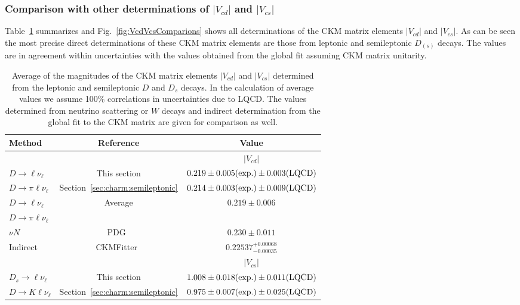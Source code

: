 \subsubsection{Comparison with other determinations of $|V_{cd}|$ and $|V_{cs}|$}

Table~\ref{tab:CKMVcdVcs} summarizes and Fig.~\ref{fig:VcdVcsComparions} shows all determinations of the CKM matrix elements $|V_{cd}|$ and $|V_{cs}|$. As
can be seen the most precise direct determinations of these CKM matrix elements are those from leptonic and semileptonic $D_{(s)}$ decays. The values are in agreement
within uncertainties with the values obtained from the global fit assuming CKM matrix unitarity.
\begin{table}[htb]
\caption{Average of the magnitudes of the CKM matrix elements $|V_{cd}|$ and $|V_{cs}|$ determined from the leptonic and semileptonic $D$ and $D_s$ decays.
In the calculation of average values we assume 100\% correlations in uncertainties due to LQCD.  The values determined from neutrino scattering 
or $W$ decays and indirect determination from the global fit to the CKM matrix are given for comparison as well.
\label{tab:CKMVcdVcs}}
\begin{center}
\begin{tabular}{lcc}
\toprule
\rowcolor{Gray} Method & Reference & Value \\ 
\midrule
&&{$|V_{cd}|$}\\
\cline{3-3}
$D\to\ell\nu_{\ell}$ 	 & This section			& $0.219\pm0.005(\rm exp.)\pm0.003(\rm LQCD)$\\
$D\to\pi\ell\nu_{\ell}$  & Section~\ref{sec:charm:semileptonic}		& $0.214\pm0.003(\rm exp.)\pm0.009(\rm LQCD)$\\
\midrule
\rowcolor{Gray} $D\to\ell\nu_{\ell}$ 	& \multirow{2}{*}{Average}	& \multirow{2}{*}{$0.219\pm0.006$}\\
\rowcolor{Gray} $D\to\pi\ell\nu_{\ell}$ & \multirow{-2}{*}{Average}	& \multirow{-2}{*}{$0.219\pm0.006$}\\
\midrule
$\nu N$			& PDG~\cite{PDG_2012}	& $0.230\pm0.011$\\
Indirect		& CKMFitter~\cite{CKMFitter}		& $0.22537^{+0.00068}_{-0.00035}$\\
\midrule
\midrule
&&{$|V_{cs}|$}\\
\cline{3-3}
$D_s\to\ell\nu_{\ell}$ 	 & This section			& $1.008\pm0.018(\rm exp.)\pm0.011(\rm LQCD)$\\
$D\to K\ell\nu_{\ell}$   & Section~\ref{sec:charm:semileptonic}		& $0.975\pm0.007(\rm exp.)\pm0.025(\rm LQCD)$\\

\end{tabular}
\end{center}
\end{table}
